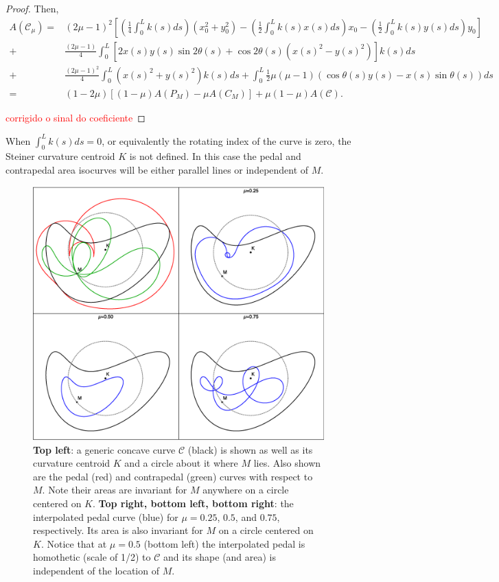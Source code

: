 \begin{proof}
Then,
{  \tiny
\begin{align*}
    A(\mathcal{C}_\mu)=   &(2\mu-1)^2\left[ \left( \frac{1}{4}  \int_0^L k(s)ds \right) (x_0^2+y_0^2) -  \left(\frac{1}{2} \int_0^L k(s)  x(s)ds\right)   x_0  - \left(\frac{1}{2} \int_0^L k(s)  y(s)ds\right)  y_0\right]  \\
      +&\frac{(2\mu-1)}{4}  \int_0^L \left[ 2 x(s)y(s)\sin2\theta(s)+\cos2\theta(s)(x(s)^2-y(s)^2) \right] k(s)ds\\
     +&\frac{(2\mu-1)^2}{4} \int_0^L    (x(s)^2+y(s)^2)  k(s)ds 
     +  \int_0^L \frac{1}{2}\mu(\mu-1)\left( \cos\theta(s) y(s)-x(s)\sin\theta(s) \right) ds\\
     =&(1-2\mu)[(1-\mu) A(P_M)-\mu A(C_M)]+\mu(1-\mu)A(\mathcal{C}).
\end{align*}
}	

\textcolor{red}{corrigido o sinal do coeficiente}
\end{proof}

\begin{remark*} When $\int_0^L k(s)ds=0$, or equivalently the rotating index of the curve is zero, the Steiner curvature centroid $K$ is not defined. In this case the pedal and contrapedal area isocurves will be either parallel lines or independent of $M$.
\end{remark*}

\begin{figure}
    \centering
    \includegraphics[width=\textwidth]{pics/0070_interpolated_concave.eps}
    \caption{\textbf{Top left}: a generic concave curve $\mathcal{C}$ (black) is shown as well as its curvature centroid $K$ and a circle about it where $M$ lies. Also shown are the pedal (red) and contrapedal (green) curves with respect to $M$. Note their areas are invariant for $M$ anywhere on a circle centered on $K$. \textbf{Top right, bottom left, bottom right}: the interpolated pedal curve (blue) for $\mu=0.25$, $0.5$, and $0.75$, respectively. Its area is also invariant for $M$ on a circle centered on $K$. Notice that at $\mu=0.5$ (bottom left) the interpolated pedal is homothetic (scale of 1/2) to $\mathcal{C}$ and its shape (and area) is independent of the location of $M$.}
    \label{fig:interp-concave}
\end{figure}